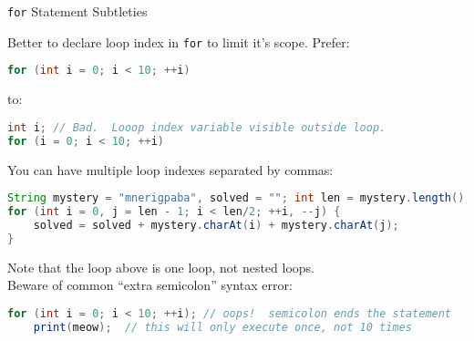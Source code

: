 \documentclass{beamer}
\begin{document}
\begin{frame}[fragile]{{\tt for} Statement Subtleties}


Better to declare loop index in {\tt for} to limit it's scope.  Prefer:
\vspace{-.05in}
\begin{lstlisting}[language=Java]
for (int i = 0; i < 10; ++i)
\end{lstlisting}
\vspace{-.1in}
to:
\vspace{-.05in}
\begin{lstlisting}[language=Java]
int i; // Bad.  Looop index variable visible outside loop.
for (i = 0; i < 10; ++i)
\end{lstlisting}
\vspace{-.1in}
You can have multiple loop indexes separated by commas:
\vspace{-.05in}
\begin{lstlisting}[language=Java]
String mystery = "mnerigpaba", solved = ""; int len = mystery.length();
for (int i = 0, j = len - 1; i < len/2; ++i, --j) {
    solved = solved + mystery.charAt(i) + mystery.charAt(j);
}
\end{lstlisting}
\vspace{-.1in}
Note that the loop above is one loop, not nested loops.\\
\vspace{.025in}
Beware of common ``extra semicolon'' syntax error:
\vspace{-.1in}
\begin{lstlisting}[language=Java]
for (int i = 0; i < 10; ++i); // oops!  semicolon ends the statement
    print(meow);  // this will only execute once, not 10 times
\end{lstlisting}


\end{frame}
\end{document}
